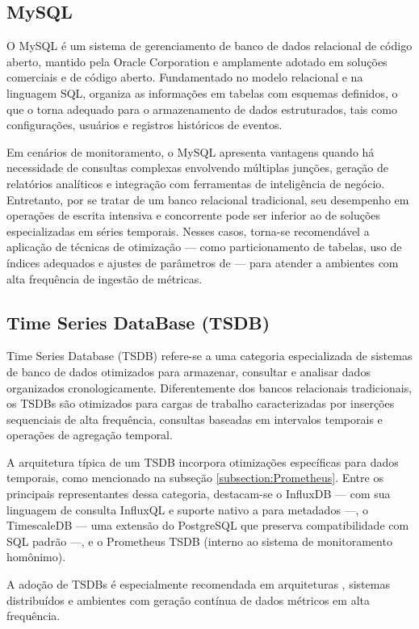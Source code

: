 \subsection{MySQL}
\label{subsection:MySQL}

{\color{red}

O MySQL \citep{mysql2025} é um sistema de gerenciamento de banco de dados relacional de código aberto, mantido pela Oracle Corporation e amplamente adotado em soluções comerciais e de código aberto. Fundamentado no modelo relacional e na linguagem SQL, organiza as informações em tabelas com esquemas definidos, o que o torna adequado para o armazenamento de dados estruturados, tais como configurações, usuários e registros históricos de eventos.

Em cenários de monitoramento, o MySQL apresenta vantagens quando há necessidade de consultas complexas envolvendo múltiplas junções, geração de relatórios analíticos e integração com ferramentas de inteligência de negócio. Entretanto, por se tratar de um banco relacional tradicional, seu desempenho em operações de escrita intensiva e concorrente pode ser inferior ao de soluções especializadas em séries temporais. Nesses casos, torna-se recomendável a aplicação de técnicas de otimização — como particionamento de tabelas, uso de índices adequados e ajustes de parâmetros de  — para atender a ambientes com alta frequência de ingestão de métricas.
}

\subsection{Time Series DataBase (TSDB)}
\label{subsection:TSDB}

{\color{red}

Time Series Database (TSDB) \citep{tigerdata2024} refere-se a uma categoria especializada de sistemas de banco de dados otimizados para armazenar, consultar e analisar dados organizados cronologicamente. Diferentemente dos bancos relacionais tradicionais, os TSDBs são otimizados para cargas de trabalho caracterizadas por inserções sequenciais de alta frequência, consultas baseadas em intervalos temporais e operações de agregação temporal.

A arquitetura típica de um TSDB incorpora otimizações específicas para dados temporais, como mencionado na subseção \ref{subsection:Prometheus}. Entre os principais representantes dessa categoria, destacam-se o InfluxDB — com sua linguagem de consulta InfluxQL e suporte nativo a  para metadados —, o TimescaleDB — uma extensão do PostgreSQL que preserva compatibilidade com SQL padrão —, e o Prometheus TSDB (interno ao sistema de monitoramento homônimo).

A adoção de TSDBs é especialmente recomendada em arquiteturas , sistemas distribuídos e ambientes com geração contínua de dados métricos em alta frequência.

}

